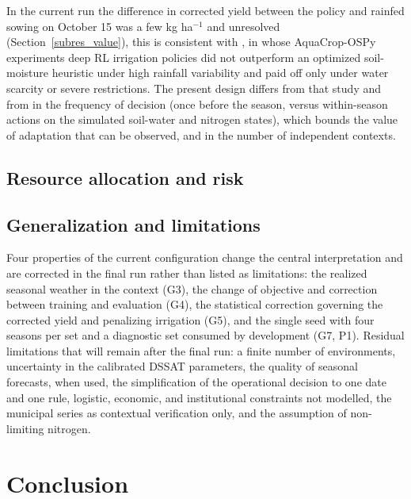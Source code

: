 \documentclass[times,final,authoryear]{elsarticle}
\begin{document}
In the current run the difference in corrected yield between the policy and rainfed sowing on October 15 was a few kg ha$^{-1}$ and unresolved (Section~\ref{subres_value}), this is consistent with \citet{kelly2024assessing}, in whose AquaCrop-OSPy experiments deep RL irrigation policies did not outperform an optimized soil-moisture heuristic under high rainfall variability and paid off only under water scarcity or severe restrictions. The present design differs from that study and from \citet{balderas2025comparative} in the frequency of decision (once before the season, versus within-season actions on the simulated soil-water and nitrogen states), which bounds the value of adaptation that can be observed, and in the number of independent contexts. 



\subsection{Resource allocation and risk}
\label{subdisc_resources}



\subsection{Generalization and limitations}
\label{subdisc_limitations}



Four properties of the current configuration change the central interpretation and are corrected in the final run rather than listed as limitations: the realized seasonal weather in the context (G3), the change of objective and correction between training and evaluation (G4), the statistical correction governing the corrected yield and penalizing irrigation (G5), and the single seed with four seasons per set and a diagnostic set consumed by development (G7, P1). Residual limitations that will remain after the final run: a finite number of environments, uncertainty in the calibrated DSSAT parameters, the quality of seasonal forecasts, when used, the simplification of the operational decision to one date and one rule, logistic, economic, and institutional constraints not modelled, the municipal series as contextual verification only, and the assumption of non-limiting nitrogen.


\section{Conclusion}
\label{conclusao}
\end{document}
